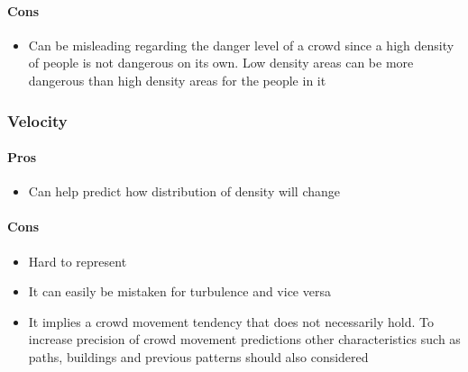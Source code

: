 \paragraph{Cons}
\begin{itemize}
    \item Can be misleading regarding the danger level of a crowd since a high density of people is not dangerous on its own. Low density areas can be more dangerous than high density areas for the people in it
\end{itemize}

\subsubsection{Velocity}


\paragraph{Pros}
\begin{itemize}
    \item Can help predict how distribution of density will change
\end{itemize}

\paragraph{Cons}
\begin{itemize}
    \item Hard to represent
    \item It can easily be mistaken for turbulence and vice versa
    \item It implies a crowd movement tendency that does not necessarily hold. To increase precision of crowd movement predictions other characteristics such as paths, buildings and previous patterns should also considered
\end{itemize}

